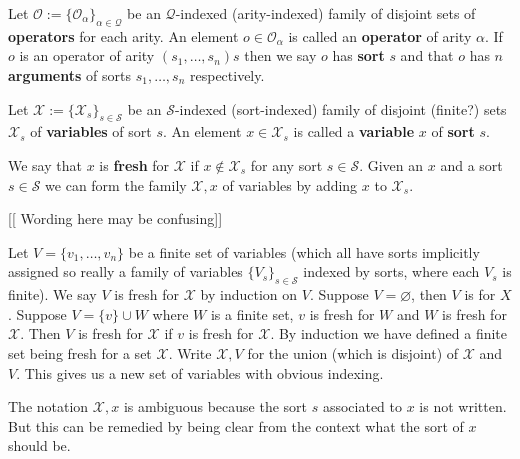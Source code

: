 \begin{defin}[Operators]
    Let $\mathcal{O} :=\{ \mathcal{O}_\alpha \}_{\alpha \in \mathcal{Q}}$ be an $\mathcal{Q}$-indexed (arity-indexed) family of disjoint sets of \textbf{operators} for each arity. An element $o \in \mathcal{O}_\alpha$ is called an \textbf{operator} of arity $\alpha$. If $o$ is an operator of arity $(s_1,\dots,s_n)s$ then we say $o$ has \textbf{sort} $s$ and that $o$ has $n$ \textbf{arguments} of sorts $s_1,\dots,s_n$ respectively.
\end{defin}

\begin{defin}[Variables]
    Let $\mathcal{X}:= \{ \mathcal{X}_s\}_{s \in \mathcal{S}}$ be an $\mathcal{S}$-indexed (sort-indexed) family of disjoint (finite?) sets $\mathcal{X}_s$ of \textbf{variables} of sort $s$. An element $x\in\mathcal{X}_s$ is called a \textbf{variable} $x$ of \textbf{sort} $s$. 
\end{defin}

\begin{defin}
    We say that $x$ is \textbf{fresh} for $\mathcal{X}$ if $x \not\in \mathcal{X}_s$ for any sort $s\in \mathcal{S}$. Given an $x$ and a sort $s\in \mathcal{S}$ we can form the family $\mathcal{X},x$ of variables by adding $x$ to $\mathcal{X}_s$. 
\end{defin}


[[ Wording here may be confusing]]
\begin{defin}
    Let $V=\{ v_1 ,\dots, v_n\}$ be a finite set of variables (which all have sorts implicitly assigned so really a family of variables $\{V_s\}_{s\in\mathcal{S}}$ indexed by sorts, where each $V_s$ is finite). We say $V$ is fresh for $\mathcal{X}$ by induction on $V$. Suppose $V=\varnothing$, then $V$ is  for $X$. Suppose $V = \{v \} \cup W$ where $W$ is a finite set, $v$ is fresh for $W$ and $W$ is fresh for $\mathcal{X}$. Then $V$ is fresh for $\mathcal{X}$ if $v$ is fresh for $\mathcal{X}$. By induction we have defined a finite set being fresh for a set $\mathcal{X}$. Write $\mathcal{X},V$ for the union (which is disjoint) of $\mathcal{X}$ and $V$. This gives us a new set of variables with obvious indexing.
\end{defin}

\begin{remark}
    The notation $\mathcal{X},x$ is ambiguous because the sort $s$ associated to $x$ is not written. But this can be remedied by being clear from the context what the sort of $x$ should be.
\end{remark}


